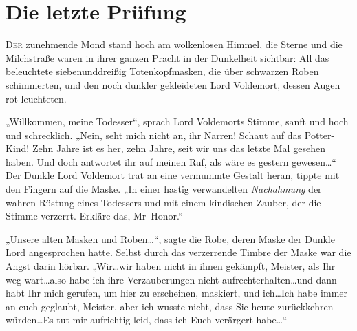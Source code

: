 \chapter{Die letzte Prüfung}

\lettrine{D}{er} zunehmende Mond stand hoch am wolkenlosen Himmel, die Sterne und die Milchstraße waren in ihrer ganzen Pracht in der Dunkelheit sichtbar: All das beleuchtete siebenunddreißig Totenkopfmasken, die über schwarzen Roben schimmerten, und den noch dunkler gekleideten Lord Voldemort, dessen Augen rot leuchteten.

„Willkommen, meine Todesser“, sprach Lord Voldemorts Stimme, sanft und hoch und schrecklich. „Nein, seht mich nicht an, ihr Narren! Schaut auf das Potter-Kind! Zehn Jahre ist es her, zehn Jahre, seit wir uns das letzte Mal gesehen haben. Und doch antwortet ihr auf meinen Ruf, als wäre es gestern gewesen…“
Der Dunkle Lord Voldemort trat an eine vermummte Gestalt heran, tippte mit den Fingern auf die Maske.
„In einer hastig verwandelten \emph{Nachahmung} der wahren Rüstung eines Todessers und mit einem kindischen Zauber, der die Stimme verzerrt. Erkläre das, Mr~Honor.“

„Unsere alten Masken und Roben…“, sagte die Robe, deren Maske der Dunkle Lord angesprochen hatte. Selbst durch das verzerrende Timbre der Maske war die Angst darin hörbar. „Wir…wir haben nicht in ihnen gekämpft, Meister, als Ihr weg wart…also habe ich ihre Verzauberungen nicht aufrechterhalten…und dann habt Ihr mich gerufen, um hier zu erscheinen, maskiert, und ich…Ich habe immer an euch geglaubt, Meister, aber ich wusste nicht, dass Sie heute zurückkehren würden…Es tut mir aufrichtig leid, dass ich Euch verärgert habe…“

